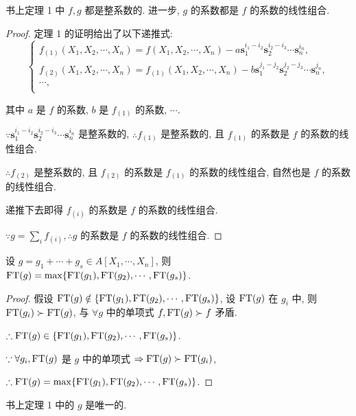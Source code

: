 \documentclass[color=black,device=normal,lang=cn,mode=geye]{elegantnote}
\begin{document}
\begin{theorem}
    书上定理 1 中 $f,g$ 都是整系数的. 进一步, $g$ 的系数都是 $f$ 的系数的线性组合.
\end{theorem}
\begin{proof}
    定理 1 的证明给出了以下递推式:
    \[\begin{cases}
        f_{(1)}(X_1,X_2,\cdots,X_n)=f(X_1,X_2,\cdots,X_n)-a\mathbf{s}_1^{i_1-i_2}\mathbf{s}_2^{i_2-i_3}\cdots\mathbf{s}_n^{i_n}, \\
        f_{(2)}(X_1,X_2,\cdots,X_n)=f_{(1)}(X_1,X_2,\cdots,X_n)-b\mathbf{s}_1^{j_1-j_2}\mathbf{s}_2^{j_2-j_3}\cdots\mathbf{s}_n^{j_n}, \\
        \cdots, \\
    \end{cases}\]

    其中 $a$ 是 $f$ 的系数, $b$ 是 $f_{(1)}$ 的系数, $\cdots$.

    $\because\mathbf{s}_1^{i_1-i_2}\mathbf{s}_2^{i_2-i_3}\cdots\mathbf{s}_n^{i_n}$ 是整系数的, $\therefore f_{(1)}$ 是整系数的, 且 $f_{(1)}$ 的系数是 $f$ 的系数的线性组合.

    $\therefore f_{(2)}$ 是整系数的, 且 $f_{(2)}$ 的系数是 $f_{(1)}$ 的系数的线性组合, 自然也是 $f$ 的系数的线性组合.

    递推下去即得 $f_{(i)}$ 的系数是 $f$ 的系数的线性组合.

    $\because g=\sum\limits_{i}f_{(i)},\therefore g$ 的系数是 $f$ 的系数的线性组合.
\end{proof}
\begin{lemma}\label{l2.1}
    设 $g=g_1+\cdots+g_s\in A[X_1,\cdots,X_n]$, 则 $\operatorname{FT} (g)=\max\{\operatorname{FT} (g_1),\operatorname{FT} (g_2),\cdots,\operatorname{FT} (g_s)\}$.
\end{lemma}
\begin{proof}
    假设 $\operatorname{FT} (g)\notin\{\operatorname{FT} (g_1),\operatorname{FT} (g_2),\cdots,\operatorname{FT} (g_s)\}$, 设 $\operatorname{FT} (g)$ 在 $g_i$ 中, 则 $\operatorname{FT} (g_i)\succ\operatorname{FT} (g)$, 与 $\forall g$ 中的单项式 $f,\operatorname{FT} (g)\succ f$ 矛盾.

    $\therefore\operatorname{FT} (g)\in\{\operatorname{FT} (g_1),\operatorname{FT} (g_2),\cdots,\operatorname{FT} (g_s)\}$.

    $\because\forall g_i,\operatorname{FT} (g)$ 是 $g$ 中的单项式 $\Rightarrow\operatorname{FT} (g)\succ\operatorname{FT} (g_i)$,
    
    $\therefore\operatorname{FT} (g)=\max\{\operatorname{FT} (g_1),\operatorname{FT} (g_2),\cdots,\operatorname{FT} (g_s)\}$.
\end{proof}
\begin{theorem}
    书上定理 1 中的 $g$ 是唯一的.
\end{theorem}
\end{document}
